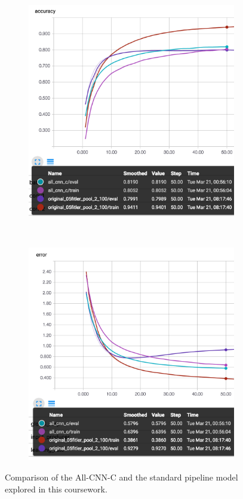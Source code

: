 \documentclass[12pt]{article}
\begin{document}
\begin{figure}[ht!]
    \centering
    \begin{subfigure}[t]{0.475\textwidth}
        \centering
        \includegraphics[width=1.0\linewidth]{alla.png}
    \end{subfigure}%
    ~ 
    \begin{subfigure}[t]{0.475\textwidth}
        \centering
        \includegraphics[width=1.0\linewidth]{alle.png}
    \end{subfigure}
    \caption{Comparison of the All-CNN-C and the standard pipeline model explored in this coursework. }
    \label{fig:al}
\end{figure}
\end{document}
